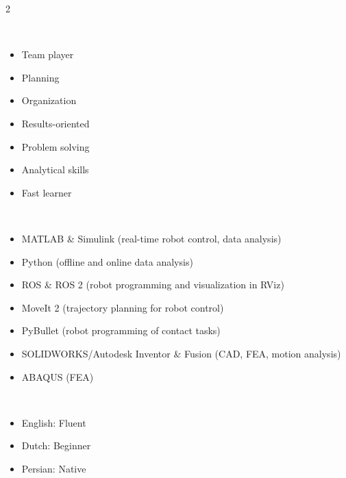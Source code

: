 \documentclass[lighthipster]{simplehipstercv}
\begin{document}
\begin{paracol}{2}
{			\bigskip
			\bigskip

			 \\[0.5em]
			\begin{itemize}[leftmargin=1em, itemsep=0pt, topsep=0pt]
				\item Team player
				\item Planning
				\item Organization
				\item Results-oriented
				\item Problem solving
				\item Analytical skills
				\item Fast learner
			\end{itemize}

			\bigskip
			\bigskip

			 \\[0.5em]

			\begin{itemize}[leftmargin=1em, itemsep=0pt, topsep=0pt]
				\item MATLAB \& Simulink (real-time robot control, data analysis)
				\item Python (offline and online data analysis)
				\item ROS \& ROS 2 (robot programming and visualization in RViz)
				\item MoveIt 2 (trajectory planning for robot control)
				\item PyBullet (robot programming of contact tasks)
				\item SOLIDWORKS/Autodesk Inventor \& Fusion (CAD, FEA, motion analysis)
				\item ABAQUS (FEA)
			\end{itemize}

			\bigskip
			\bigskip

			\\[0.5em]
			\begin{itemize}[leftmargin=1em, itemsep=0pt, topsep=0pt]
				\item English: Fluent
				\item Dutch: Beginner
				\item Persian: Native
			\end{itemize}

}
\end{paracol}
\end{document}
